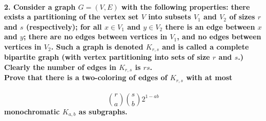 \documentclass{article}
\begin{document}
\paragraph{2. Consider a graph $G = (V, E)$ with the following properties: 
there exists a partitioning of the vertex set $V$ into subsets $V_1$ and $V_2$ 
of sizes $r$ and $s$ (respectively); for all $x \in V_1$ and $y \in V_2$ there 
is an edge between $x$ and $y$; there are no edges between vertices in $V_1$, 
and no edges between vertices in $V_2$. Such a graph is denoted $K_{r,s}$ and 
is called a complete bipartite graph (with vertex partitioning into sets of 
size $r$ and $s$.) Clearly the number of edges in $K_{r,s}$ is $rs$.\\
Prove that there is a two-coloring of edges of $K_{r,s}$ with at most}
\begin{equation*}
{r\choose a}{s\choose b}2^{1-ab}
\end{equation*}
\textbf{monochromatic $K_{a,b}$ as subgraphs.}
\end{document}

